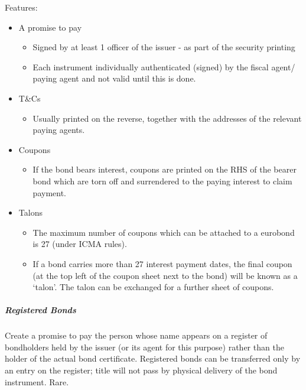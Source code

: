 \documentclass[
]{article}
\providecommand{\tightlist}{%
  \setlength{\itemsep}{0pt}\setlength{\parskip}{0pt}}
\begin{document}
Features:

\begin{itemize}
\tightlist
\item
  A promise to pay

  \begin{itemize}
  \tightlist
  \item
    Signed by at least 1 officer of the issuer - as part of the security
    printing
  \item
    Each instrument individually authenticated (signed) by the fiscal
    agent/ paying agent and not valid until this is done.
  \end{itemize}
\item
  T\&Cs

  \begin{itemize}
  \tightlist
  \item
    Usually printed on the reverse, together with the addresses of the
    relevant paying agents.
  \end{itemize}
\item
  Coupons

  \begin{itemize}
  \tightlist
  \item
    If the bond bears interest, coupons are printed on the RHS of the
    bearer bond which are torn off and surrendered to the paying
    interest to claim payment.
  \end{itemize}
\item
  Talons

  \begin{itemize}
  \tightlist
  \item
    The maximum number of coupons which can be attached to a eurobond is
    27 (under ICMA rules).
  \item
    If a bond carries more than 27 interest payment dates, the final
    coupon (at the top left of the coupon sheet next to the bond) will
    be known as a `talon'. The talon can be exchanged for a further
    sheet of coupons.
  \end{itemize}
\end{itemize}

\hypertarget{registered-bonds}{%
\subparagraph{Registered Bonds}\label{registered-bonds}}

Create a promise to pay the person whose name appears on a register of
bondholders held by the issuer (or its agent for this purpose) rather
than the holder of the actual bond certificate. Registered bonds can be
transferred only by an entry on the register; title will not pass by
physical delivery of the bond instrument. Rare.
\end{document}
